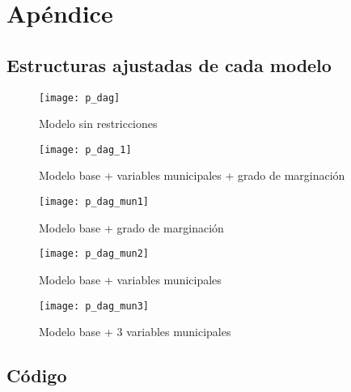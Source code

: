 \chapter{Apéndice}
%
%
%
%
\section{Estructuras ajustadas de cada modelo}
\begin{figure}
    \caption{Modelo sin restricciones}
    \texttt{[image: p\_dag]}
\end{figure}
\pagebreak
\begin{figure}
    \caption{Modelo base + variables municipales + grado de marginación}
    \texttt{[image: p\_dag\_1]}
\end{figure}
\pagebreak
\begin{figure}
    \caption{Modelo base + grado de marginación}
    \texttt{[image: p\_dag\_mun1]}
\end{figure}
\pagebreak
\begin{figure}
    \caption{Modelo base + variables municipales}
    \texttt{[image: p\_dag\_mun2]}
\end{figure}
\pagebreak
\begin{figure}
    \caption{Modelo base + 3 variables municipales}
    \texttt{[image: p\_dag\_mun3]}
\end{figure}
\pagebreak
\section{Código}

\pagebreak

